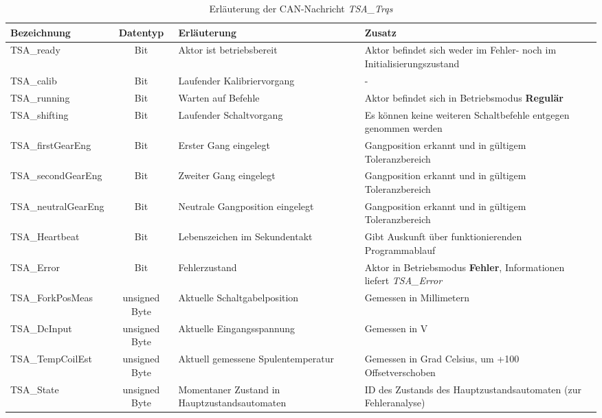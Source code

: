 \begin{table}%
\centering
\begin{tabular}{l c p{6cm} p{4cm}}
\hline
Bezeichnung & Datentyp & Erläuterung & Zusatz \\
\hline
TSA\_ready & Bit & Aktor ist betriebsbereit & Aktor befindet sich weder im Fehler- noch im Initialisierungszustand \newline \\
TSA\_calib & Bit & Laufender Kalibriervorgang & - \newline \\
TSA\_running & Bit & Warten auf Befehle & Aktor befindet sich in Betriebsmodus \textbf{Regulär} \newline \\
TSA\_shifting & Bit & Laufender Schaltvorgang & Es können keine weiteren Schaltbefehle entgegen genommen werden \newline\\
TSA\_firstGearEng & Bit & Erster Gang eingelegt & Gangposition erkannt und in gültigem Toleranzbereich \newline \\
TSA\_secondGearEng & Bit & Zweiter Gang eingelegt & Gangposition erkannt und in gültigem Toleranzbereich \newline \\
TSA\_neutralGearEng & Bit & Neutrale Gangposition eingelegt & Gangposition erkannt und in gültigem Toleranzbereich \newline \\
TSA\_Heartbeat& Bit & Lebenszeichen im Sekundentakt & Gibt Auskunft über funktionierenden Programmablauf \newline \newline \\
TSA\_Error & Bit & Fehlerzustand & Aktor in Betriebsmodus \textbf{Fehler}, Informationen liefert \textit{TSA\_Error} \newline \\
TSA\_ForkPosMeas & unsigned Byte & Aktuelle Schaltgabelposition & Gemessen in Millimetern \newline \\
TSA\_DcInput & unsigned Byte & Aktuelle Eingangsspannung & Gemessen in V \newline \\
TSA\_TempCoilEst & unsigned Byte & Aktuell gemessene Spulentemperatur & Gemessen in Grad Celsius, um +100 Offsetverschoben \newline \\
TSA\_State & unsigned Byte & Momentaner Zustand in Hauptzustandsautomaten & ID des Zustands des Hauptzustandsautomaten (zur Fehleranalyse) \\
\end{tabular}
\caption{Erläuterung der CAN-Nachricht \textit{TSA\_Trqs}}
\label{tab_tsa_trqs}
\end{table}

